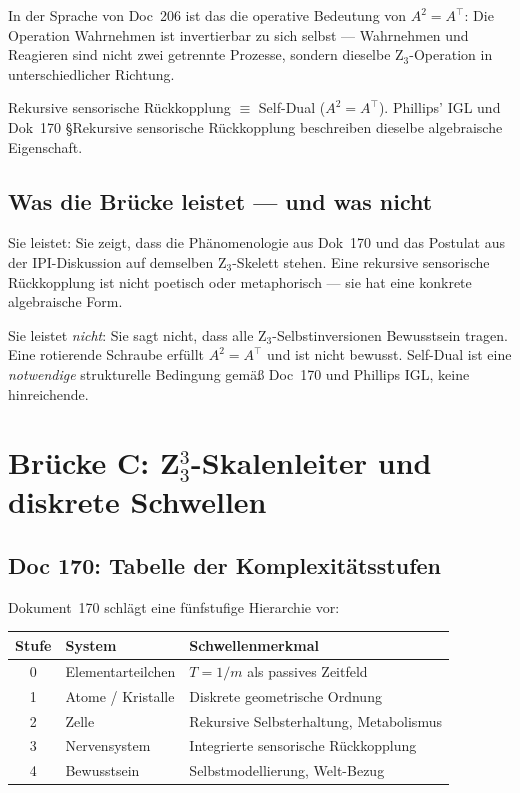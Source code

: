 In der Sprache von Doc~206 ist das die operative Bedeutung von $A^2 = A^\top$: Die Operation \glqq Wahrnehmen\grqq{} ist invertierbar zu sich selbst — Wahrnehmen und Reagieren sind nicht zwei getrennte Prozesse, sondern dieselbe Z$_3$-Operation in unterschiedlicher Richtung.

\begin{insightBox}
Rekursive sensorische Rückkopplung $\equiv$ Self-Dual ($A^2 = A^\top$). Phillips' IGL und Dok~170 \S{}Rekursive sensorische Rückkopplung beschreiben dieselbe algebraische Eigenschaft.
\end{insightBox}

\subsection{Was die Brücke leistet — und was nicht}

Sie leistet: Sie zeigt, dass die Phänomenologie aus Dok~170 und das Postulat aus der IPI-Diskussion auf demselben Z$_3$-Skelett stehen. Eine \glqq rekursive sensorische Rückkopplung\grqq{} ist nicht poetisch oder metaphorisch — sie hat eine konkrete algebraische Form.

Sie leistet \emph{nicht}: Sie sagt nicht, dass alle Z$_3$-Selbstinversionen Bewusstsein tragen. Eine rotierende Schraube erfüllt $A^2 = A^\top$ und ist nicht bewusst. Self-Dual ist eine \emph{notwendige} strukturelle Bedingung gemäß Doc~170 und Phillips IGL, keine hinreichende.

\section{\texorpdfstring{Brücke C: Z$_3^3$-Skalenleiter und diskrete Schwellen}{Brücke C: Z3-hoch-3-Skalenleiter und diskrete Schwellen}}\label{sec:brueckeC}

\subsection{Doc 170: Tabelle der Komplexitätsstufen}

Dokument~170 schlägt eine fünfstufige Hierarchie vor:

\begin{center}
\begin{tabular}{c|l|l}
\textbf{Stufe} & \textbf{System} & \textbf{Schwellenmerkmal} \\
\hline
0 & Elementarteilchen & $T = 1/m$ als passives Zeitfeld \\
1 & Atome / Kristalle & Diskrete geometrische Ordnung \\
2 & Zelle & Rekursive Selbsterhaltung, Metabolismus \\
3 & Nervensystem & Integrierte sensorische Rückkopplung \\
4 & Bewusstsein & Selbstmodellierung, Welt-Bezug \\
\end{tabular}
\end{center}

